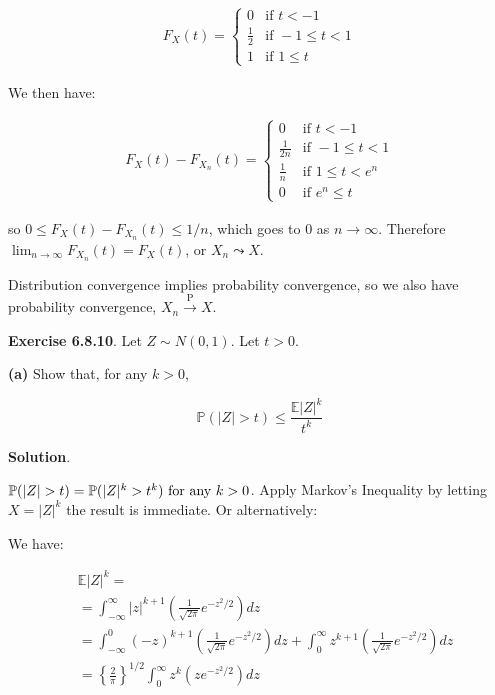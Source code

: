 \begin{align*}  F_X(t) =
    \begin{cases}
      0   & \text{if } t < -1 \\
      \frac{1}{2} & \text{if } -1 \leq t < 1 \\
      1 & \text{if } 1 \leq t
    \end{cases}       
\end{align*}

We then have:

\begin{align*}  F_X(t) - F_{X_{n}}(t) =
    \begin{cases}
      0   & \text{if } t < -1 \\
      \frac{1}{2n} & \text{if } -1 \leq t < 1 \\
      \frac{1}{n} & \text{if } 1 \leq t < e^{n} \\
      0 & \text{if } e^{n} \leq t
    \end{cases}       
\end{align*}

so \(0 \leq F_X(t) - F_{X_{n}}(t) \leq 1/n\), which goes to 0 as
\(n \rightarrow \infty\). Therefore
\(\lim _{n \rightarrow \infty} F_{X_{n}}(t) = F_X(t)\), or
\(X_{n} \leadsto X\).

Distribution convergence implies probability convergence, so we also
have probability convergence, \(X_{n} \xrightarrow{\text{P}} X\).

\textbf{Exercise 6.8.10}. Let \(Z \sim N(0, 1)\). Let \(t > 0\).

\textbf{(a)} Show that, for any \(k > 0\),

\[\mathbb{P}(|Z| > t) \leq \frac{\mathbb{E}|Z|^{k}}{t^{k}}\]

\textbf{Solution}.

\(\mathbb{P} (|Z| > t) = \mathbb{P}
(| Z|^{k} > t^{k}) $ for any \(k > 0\).
Apply Markov's Inequality by letting \(X = |Z|^{k}\) the result is
immediate. Or alternatively:

We have:

\begin{align*}
&\mathbb{E}|Z|^{k} = \\
&= \int _{-\infty}^{\infty} |z|^{k+1}\left( \frac{1}{\sqrt{2\pi}} e^{-z^{2}/2} \right) dz \\
&= \int _{-\infty}^{0} (-z)^{k+1}\left( \frac{1}{\sqrt{2\pi}} e^{-z^{2}/2} \right) dz
  + \int _{0}^{\infty} z^{k+1}\left( \frac{1}{\sqrt{2\pi}} e^{-z^{2}/2} \right) dz \\
&=  \left\{ \frac{2}{\pi} \right\}^{1/2} \int _{0}^{\infty} z^{k} \left( z e^{-z^{2}/2} \right) dz
\end{align*}

